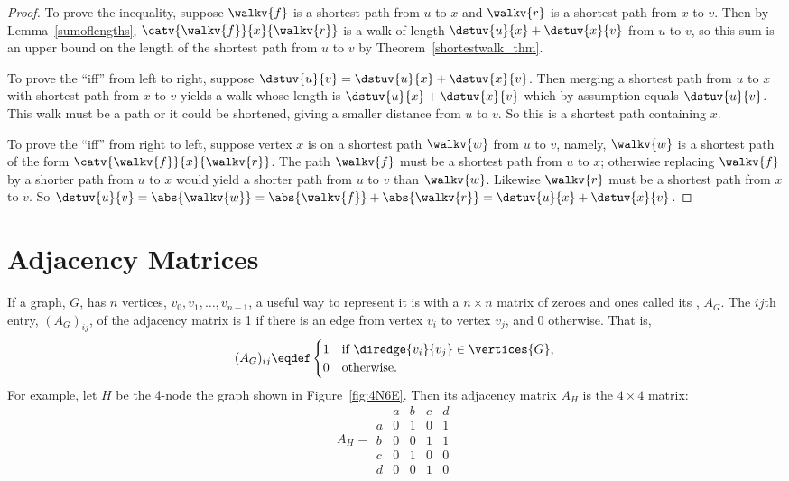 \begin{proof}
  To prove the inequality, suppose $\walkv{f}$ is a shortest path from
  $u$ to $x$ and $\walkv{r}$ is a shortest path from $x$ to $v$.  Then
  by Lemma~\ref{sumoflengths}, $\catv{\walkv{f}}{x}{\walkv{r}}$ is a
  walk of length $\dstuv{u}{x} + \dstuv{x}{v}$ from $u$ to $v$, so
  this sum is an upper bound on the length of the shortest path from
  $u$ to $v$ by Theorem~\ref{shortestwalk_thm}.

  To prove the ``iff'' from left to right, suppose $\dstuv{u}{v} =
  \dstuv{u}{x} + \dstuv{x}{v}$.  Then merging a shortest path from $u$
  to $x$ with shortest path from $x$ to $v$ yields a walk whose length
  is $\dstuv{u}{x} + \dstuv{x}{v}$ which by assumption equals
  $\dstuv{u}{v}$.  This walk must be a path or it could be shortened,
  giving a smaller distance from $u$ to $v$.  So this is a shortest
  path containing $x$.

  To prove the ``iff'' from right to left, suppose vertex $x$ is on a
  shortest path $\walkv{w}$ from $u$ to $v$, namely, $\walkv{w}$ is a
  shortest path of the form $\catv{\walkv{f}}{x}{\walkv{r}}$.  The
  path $\walkv{f}$ must be a shortest path from $u$ to $x$; otherwise
  replacing $\walkv{f}$ by a shorter path from $u$ to $x$ would yield
  a shorter path from $u$ to $v$ than $\walkv{w}$.  Likewise
  $\walkv{r}$ must be a shortest path from $x$ to $v$.  So
  $\dstuv{u}{v} = \abs{\walkv{w}} = \abs{\walkv{f}} + \abs{\walkv{r}}
  = \dstuv{u}{x} + \dstuv{x}{v}$.
  
\end{proof}

\section{Adjacency Matrices}
If a graph, $G$, has $n$ vertices, $v_0,v_1,\dots, v_{n-1}$, a useful
way to represent it is with a $n \times n$ matrix of zeroes and ones
called its , $A_G$.  The $ij$th
entry, $(A_G)_{ij}$, of the adjacency matrix is 1 if there is an edge
from vertex $v_i$ to vertex $v_j$, and 0 otherwise.  That is,
\[
(A_G)_{ij} \eqdef \begin{cases} 1 & \text{if } \diredge{v_i}{v_j} \in
  \vertices{G},\\
0 & \text{otherwise}.
\end{cases}
\]
For example, let $H$ be the 4-node the graph shown in
Figure~\ref{fig:4N6E}.  Then its adjacency matrix $A_H$ is the $4 \times
4$ matrix:
\[
A_H =\begin{array}{c|cccc|}
  &  a & b & c & d \\ \hline
a &  0 & 1 & 0 & 1 \\
b &  0 & 0 & 1 & 1 \\
c &  0 & 1 & 0 & 0 \\
d &  0 & 0 & 1 & 0
\end{array}
\]

